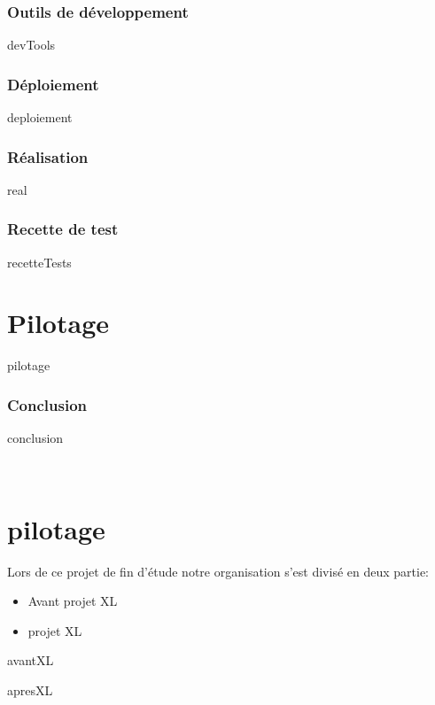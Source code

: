 \documentclass[a4paper, 12pt, titlepage, oneside, french]{article}
\begin{document}
\section{Outils de développement}
{devTools}
\newpage

\section{Déploiement}
{deploiement}
\newpage

\section{Réalisation}
{real}
\newpage

\section{Recette de test}
{recetteTests}
\newpage

\part{Pilotage}
{pilotage}
\newpage


\section{Conclusion}
{conclusion}
\newpage

\printglossary[title=Acronymes,type=\acronymtype]
\newpage 
\printglossary~\newpage 
\printbibliography~\newpage

\part{pilotage}
Lors de ce projet de fin d’étude notre organisation s'est divisé en deux partie:
\begin{itemize}
\item Avant projet XL
\item projet XL
\end{itemize}
{avantXL}
\newpage

{apresXL}
\newpage
\end{document}
